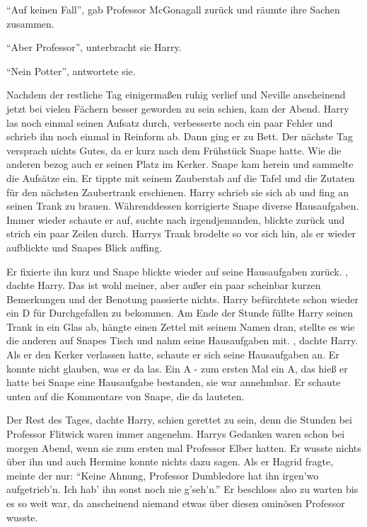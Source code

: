 \enquote{Auf keinen Fall}, gab Professor McGonagall zurück und räumte ihre Sachen zusammen.

\enquote{Aber Professor}, unterbracht sie Harry.

\enquote{Nein Potter}, antwortete sie.

\trenn

Nachdem der restliche Tag einigermaßen ruhig verlief und Neville anscheinend jetzt bei vielen Fächern besser geworden zu sein schien, kam der Abend. Harry las noch einmal seinen Aufsatz durch, verbesserte noch ein paar Fehler und schrieb ihn noch einmal in Reinform ab. Dann ging er zu Bett. Der nächste Tag versprach nichts Gutes, da er kurz nach dem Frühstück Snape hatte. Wie die anderen bezog auch er seinen Platz im Kerker. Snape kam herein und sammelte die Aufsätze ein. Er tippte mit seinem Zauberstab auf die Tafel und die Zutaten für den nächsten Zaubertrank erschienen. Harry schrieb sie sich ab und fing an seinen Trank zu brauen. Währenddessen korrigierte Snape diverse Hausaufgaben. Immer wieder schaute er auf, suchte nach irgendjemanden, blickte zurück und strich ein paar Zeilen durch. Harrys Trank brodelte so vor sich hin, als er wieder aufblickte und Snapes Blick auffing.

Er fixierte ihn kurz und Snape blickte wieder auf seine Hausaufgaben zurück. , dachte Harry. Das ist wohl meiner, aber außer ein paar scheinbar kurzen Bemerkungen und der Benotung passierte nichts. Harry befürchtete schon wieder ein D für Durchgefallen zu bekommen. Am Ende der Stunde füllte Harry seinen Trank in ein Glas ab, hängte einen Zettel mit seinem Namen dran, stellte es wie die anderen auf Snapes Tisch und nahm seine Hausaufgaben mit. , dachte Harry. Als er den Kerker verlassen hatte, schaute er sich seine Hausaufgaben an. Er konnte nicht glauben, was er da las. Ein A - zum ersten Mal ein A, das hieß er hatte bei Snape eine Hausaufgabe bestanden, sie war annehmbar. Er schaute unten auf die Kommentare von Snape, die da lauteten. 

Der Rest des Tages, dachte Harry, schien gerettet zu sein, denn die Stunden bei Professor Flitwick waren immer angenehm. Harrys Gedanken waren schon bei morgen Abend, wenn sie zum ersten mal Professor Elber hatten. Er wusste nichts über ihn und auch Hermine konnte nichts dazu sagen. Als er Hagrid fragte, meinte der nur: \enquote{Keine Ahnung, Professor Dumbledore hat ihn irgen'wo aufgetrieb'n. Ich hab' ihn sonst noch nie g'seh'n.} Er beschloss also zu warten bis es so weit war, da anscheinend niemand etwas über diesen ominösen Professor wusste.

